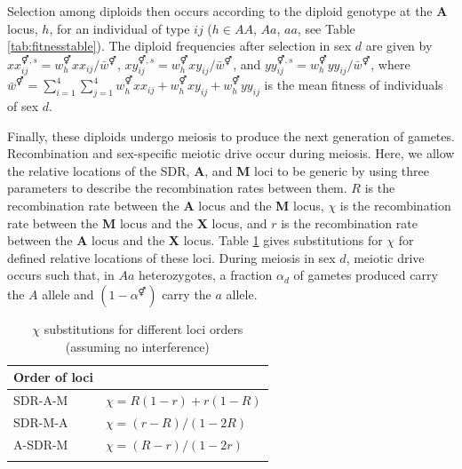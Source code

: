 \documentclass[12pt]{article}
\begin{document}
Selection among diploids then occurs according to the diploid genotype at the \textbf{A} locus, $h$, for an individual of type $ij$ ($h \in AA$, $Aa$, $aa$, see Table \ref{tab:fitnesstable}). 
The diploid frequencies after selection in sex $d$ are given by $xx_{ij}^{\Hermaphrodite,s}=w_{h}^{\Hermaphrodite} xx_{ij}/\bar{w}^{\Hermaphrodite}$, $xy_{ij}^{\Hermaphrodite,s}=w_{h}^{\Hermaphrodite} xy_{ij}/\bar{w}^{\Hermaphrodite}$, and $yy_{ij}^{\Hermaphrodite,s}=w_{h}^{\Hermaphrodite} yy_{ij}/\bar{w}^{\Hermaphrodite}$, where $\bar{w}^{\Hermaphrodite}= \sum_{i=1}^{4}\sum_{j=1}^{4}w_{h}^{\Hermaphrodite}xx_{ij}+w_{h}^{\Hermaphrodite}xy_{ij}+w_{h}^{\Hermaphrodite}yy_{ij}$ is the mean fitness of individuals of sex $d$. 

Finally, these diploids undergo meiosis to produce the next generation of gametes. 
Recombination and sex-specific meiotic drive occur during meiosis.
Here, we allow the relative locations of the SDR, \textbf{A}, and \textbf{M} loci to be generic by using three parameters to describe the recombination rates between them. $R$ is the recombination rate between the \textbf{A} locus and the \textbf{M} locus, $\chi$ is the recombination rate between the \textbf{M} locus and the \textbf{X} locus, and $r$ is the recombination rate between the \textbf{A} locus and the \textbf{X} locus. 
Table \ref{tab:chisubstitutions} gives substitutions for $\chi$ for defined relative locations of these loci.
During meiosis in sex $d$, meiotic drive occurs such that, in $Aa$ heterozygotes, a fraction $\alpha_{d}$ of gametes produced carry the $A$ allele and $(1-\alpha^\Hermaphrodite)$ carry the $a$ allele. 

\begin{table}[ht]
\centering
\smallskip
\caption{$\chi$ substitutions for different loci orders (assuming no interference)}
\begin{tabular}{l l}
\hline\hline
  Order of loci &   \\ [0.5ex] \hline
  SDR-A-M & $\chi=R(1-r)+r(1-R)$  \\
  SDR-M-A & $\chi=(r-R)/(1-2R)$ \\
  A-SDR-M & $\chi=(R-r)/(1-2r)$ \\
  \hline \hline
  \label{tab:chisubstitutions}
 \end{tabular}
\end{table}
\end{document}
